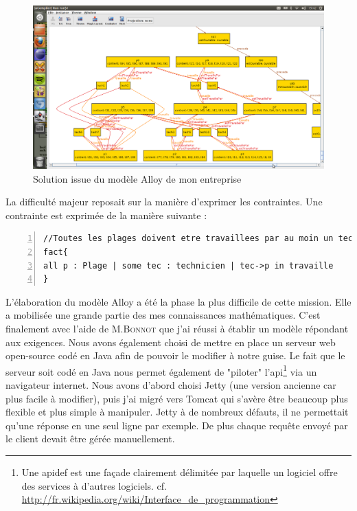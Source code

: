 \begin{center}
  \begin{figure}[hb]
    \caption{\label{solution} Solution issue du modèle Alloy de mon entreprise}
    \includegraphics [width=1\textwidth]{images/alloy/solution4j10t.png}
  \end{figure}
\end{center}

La difficulté majeur reposait sur la manière d'exprimer les contraintes. Une contrainte est exprimée de la manière suivante : 
\begin{Verbatim}[frame=single,numbers=left]
//Toutes les plages doivent etre travaillees par au moin un tech
fact{
all p : Plage | some tec : technicien | tec->p in travaille
}
\end{Verbatim}

L'élaboration du modèle Alloy a été la phase la plus difficile de cette mission. Elle a mobilisée une grande partie des mes connaissances mathématiques. C'est finalement avec l'aide de M.\textsc{Bonnot} que j'ai réussi à établir un modèle répondant aux exigences.
Nous avons également choisi de mettre en place un serveur web open-source codé en Java afin de pouvoir le modifier à notre guise. Le fait que le serveur soit codé en Java nous permet également de "piloter" l'\gls{api}\footnote{Une \gls{apidef} est une façade clairement délimitée par laquelle un logiciel offre des services à d'autres logiciels. cf. \url{http://fr.wikipedia.org/wiki/Interface_de_programmation}} via un navigateur internet.
Nous avons d'abord choisi Jetty (une version ancienne car plus facile à modifier), puis j'ai migré vers Tomcat qui s'avère être beaucoup plus flexible et plus simple à manipuler.
Jetty à de nombreux défauts, il ne permettait qu'une réponse en une seul ligne par exemple. De plus chaque requête envoyé par le client devait être gérée manuellement.
